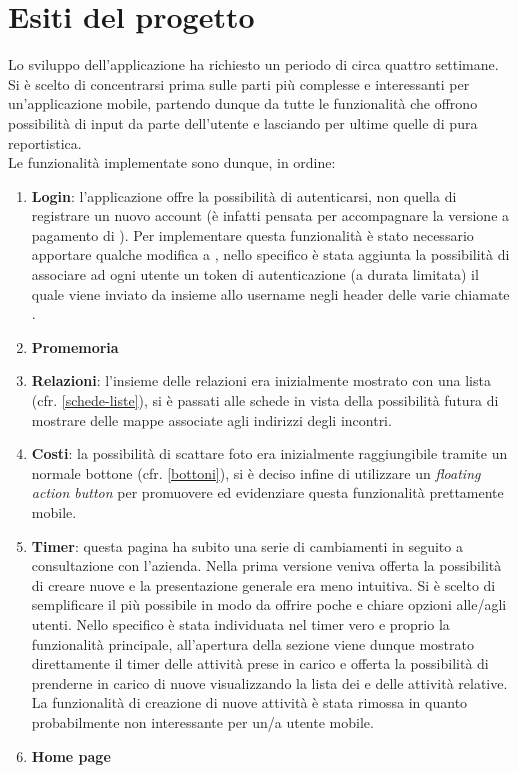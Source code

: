 \section{Esiti del progetto}\label{esiti}

Lo sviluppo dell'applicazione ha richiesto un periodo di circa quattro settimane.
Si è scelto di concentrarsi prima sulle parti più complesse e interessanti per
un'applicazione mobile, partendo dunque da tutte le funzionalità che offrono possibilità
di input da parte dell'utente e lasciando per ultime quelle di pura reportistica. \\

Le funzionalità implementate sono dunque, in ordine:

\begin{enumerate}
\item \textbf{Login}: l'applicazione offre la possibilità di autenticarsi, non quella
di registrare un nuovo account (è infatti pensata per accompagnare la versione a
pagamento di \fiscoloWeb). Per implementare questa funzionalità è stato necessario
apportare qualche modifica a \fiscoloWeb{}, nello specifico è stata aggiunta la possibilità
di associare ad ogni utente un token di autenticazione (a durata limitata) il quale viene
inviato da \fiscoloMobile{} insieme allo username negli header delle varie chiamate .
\item \textbf{Promemoria}
\item \textbf{Relazioni}: l'insieme delle relazioni era inizialmente mostrato con una
lista (cfr. \ref{schede-liste}), si è passati alle schede in vista della possibilità
futura di mostrare delle mappe associate agli indirizzi degli incontri.
\item \textbf{Costi}: la possibilità di scattare foto era inizialmente raggiungibile tramite
un normale bottone (cfr. \ref{bottoni}), si è deciso infine di utilizzare un
\textit{floating action button} per promuovere ed evidenziare questa funzionalità
prettamente mobile.
\item \textbf{Timer}: questa pagina ha subito una serie di cambiamenti in seguito a
consultazione con l'azienda. Nella prima versione veniva offerta la possibilità di creare
nuove  e la presentazione generale era meno intuitiva. Si è scelto di semplificare
il più possibile in modo da offrire poche e chiare opzioni alle/agli utenti. Nello specifico
è stata individuata nel timer vero e proprio la funzionalità principale, all'apertura della
sezione viene dunque mostrato direttamente il timer delle attività prese in carico e offerta
la possibilità di prenderne in carico di nuove visualizzando la lista dei  e delle
attività relative. La funzionalità di creazione di nuove attività è stata rimossa in quanto
probabilmente non interessante per un/a utente mobile.
\item \textbf{Home page}
\end{enumerate}

